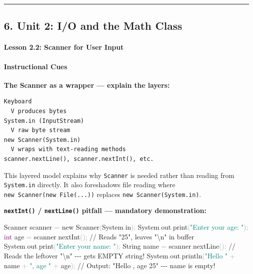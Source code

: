 \documentclass[
  justified,
  openright,
]{tufte-book}
\let\subsubsection\paragraph
\let\paragraph\paragraph
\newcommand{\BuiltInTok}[1]{#1}
\newcommand{\CommentTok}[1]{\textcolor{MidGray}{#1}}
\newcommand{\DataTypeTok}[1]{\textcolor{Purple}{#1}}
\newcommand{\FunctionTok}[1]{\textcolor{BrandBlue}{#1}}
\newcommand{\KeywordTok}[1]{\textcolor{BrandBlue}{#1}}
\newcommand{\NormalTok}[1]{#1}
\newcommand{\OperatorTok}[1]{\textcolor{DarkGray}{#1}}
\newcommand{\StringTok}[1]{\textcolor{Teal}{#1}}
\newenvironment{Shaded}{%
  \begin{snugshade}
}{%
  \end{snugshade}
}
\let\subsubsection\paragraph
\let\paragraph\paragraph
\begin{document}
\begin{center}\rule{0.5\linewidth}{0.5pt}\end{center}

\subsection{6. Unit 2: I/O and the Math
Class}\label{unit-2-io-and-the-math-class}

\subsubsection{Lesson 2.2: Scanner for User
Input}\label{lesson-2.2-scanner-for-user-input}

\paragraph{Instructional Cues}\label{instructional-cues-3}

\textbf{The Scanner as a wrapper --- explain the layers:}

\begin{verbatim}
Keyboard
  V produces bytes
System.in (InputStream)
  V raw byte stream
new Scanner(System.in)
  V wraps with text-reading methods
scanner.nextLine(), scanner.nextInt(), etc.
\end{verbatim}

This layered model explains why \texttt{Scanner} is needed rather than
reading from \texttt{System.in} directly. It also foreshadows file
reading where \texttt{new\ Scanner(new\ File(...))} replaces
\texttt{new\ Scanner(System.in)}.

\textbf{\texttt{nextInt()} / \texttt{nextLine()} pitfall --- mandatory
demonstration:}

\begin{Shaded}
\begin{Highlighting}[]
\BuiltInTok{Scanner}\NormalTok{ scanner }\OperatorTok{=} \KeywordTok{new} \BuiltInTok{Scanner}\OperatorTok{(}\BuiltInTok{System}\OperatorTok{.}\FunctionTok{in}\OperatorTok{);}
\BuiltInTok{System}\OperatorTok{.}\FunctionTok{out}\OperatorTok{.}\FunctionTok{print}\OperatorTok{(}\StringTok{"Enter your age: "}\OperatorTok{);}
\DataTypeTok{int}\NormalTok{ age }\OperatorTok{=}\NormalTok{ scanner}\OperatorTok{.}\FunctionTok{nextInt}\OperatorTok{();}          \CommentTok{// Reads "25", leaves "\textbackslash{}n" in buffer}
\BuiltInTok{System}\OperatorTok{.}\FunctionTok{out}\OperatorTok{.}\FunctionTok{print}\OperatorTok{(}\StringTok{"Enter your name: "}\OperatorTok{);}
\BuiltInTok{String}\NormalTok{ name }\OperatorTok{=}\NormalTok{ scanner}\OperatorTok{.}\FunctionTok{nextLine}\OperatorTok{();}     \CommentTok{// Reads the leftover "\textbackslash{}n" {-}{-}{-} gets EMPTY string!}
\BuiltInTok{System}\OperatorTok{.}\FunctionTok{out}\OperatorTok{.}\FunctionTok{println}\OperatorTok{(}\StringTok{"Hello "} \OperatorTok{+}\NormalTok{ name }\OperatorTok{+} \StringTok{", age "} \OperatorTok{+}\NormalTok{ age}\OperatorTok{);}
\CommentTok{// Output: "Hello , age 25" {-}{-}{-} name is empty!}
\end{Highlighting}
\end{Shaded}
\end{document}
